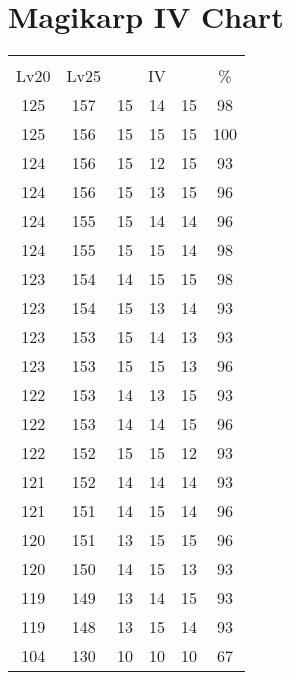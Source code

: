 \documentclass{article}%
\begin{document}
%
\normalsize%
\section{Magikarp IV Chart}%
\label{sec:Magikarp IV Chart}%
\renewcommand{\arraystretch}{1.5}%
\begin{tabular}{|c|c|c|c|c|c|}%
\hline%
\multicolumn{6}{|c|}{\textcolor{white}{ 
\linebreak{Magikarp}
}%
\cellcolor{black}}\\%
\multicolumn{1}{|c}{Lv20}&\multicolumn{1}{c|}{Lv25}&\multicolumn{3}{c|}{IV}&\multicolumn{1}{|c|}{\%}\\%
\hline%
\rowcolor{color98}%
125&157&15&14&15&98\\%
\hline%
\rowcolor{color100}%
125&156&15&15&15&100\\%
\hline%
\rowcolor{color93}%
124&156&15&12&15&93\\%
\hline%
\rowcolor{color96}%
124&156&15&13&15&96\\%
\hline%
\rowcolor{color96}%
124&155&15&14&14&96\\%
\hline%
\rowcolor{color98}%
124&155&15&15&14&98\\%
\hline%
\rowcolor{color98}%
123&154&14&15&15&98\\%
\hline%
\rowcolor{color93}%
123&154&15&13&14&93\\%
\hline%
\rowcolor{color93}%
123&153&15&14&13&93\\%
\hline%
\rowcolor{color96}%
123&153&15&15&13&96\\%
\hline%
\rowcolor{color93}%
122&153&14&13&15&93\\%
\hline%
\rowcolor{color96}%
122&153&14&14&15&96\\%
\hline%
\rowcolor{color93}%
122&152&15&15&12&93\\%
\hline%
\rowcolor{color93}%
121&152&14&14&14&93\\%
\hline%
\rowcolor{color96}%
121&151&14&15&14&96\\%
\hline%
\rowcolor{color96}%
120&151&13&15&15&96\\%
\hline%
\rowcolor{color93}%
120&150&14&15&13&93\\%
\hline%
\rowcolor{color93}%
119&149&13&14&15&93\\%
\hline%
\rowcolor{color93}%
119&148&13&15&14&93\\%
\hline%
\rowcolor{color91}%
104&130&10&10&10&67\\%
\end{tabular}

%
\end{document}
